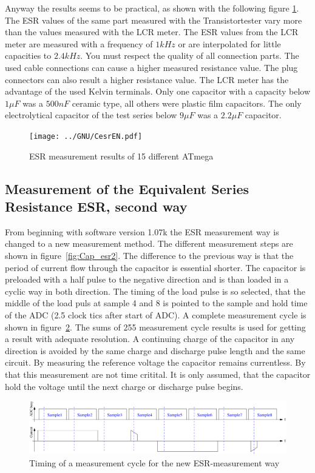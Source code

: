 Anyway the results seems to be practical, as shown with the following figure \ref{fig:Cesr}.
The ESR values of the same part measured with the Transistortester vary more than the values measured with the LCR meter.
The ESR values from the LCR meter are measured with a frequency of \(1kHz\) or are interpolated for little capacities to
\(2.4kHz\).
You must respect the quality of all connection parts. The used cable connections can cause a higher measured resistance value.
The plug connectors can also result a higher resistance value.
The LCR meter has the advantage of the used Kelvin terminals.
Only one capacitor with a capacity below \(1\mu F\) was a \(500nF\) ceramic type, all others were
plastic film capacitors.
The only electrolytical capacitor of the test series below \(9\mu F\) was a \(2.2\mu F\) capacitor.

\begin{figure}[H]
\centering
\texttt{[image: ../GNU/CesrEN.pdf]}
\caption{ESR measurement results of 15 different ATmega}
\label{fig:Cesr}
\end{figure}


\subsection{Measurement of the Equivalent Series Resistance ESR, second way}
\label{sec:ESR2}
From beginning with software version 1.07k the ESR measurement way is changed to a new measurement method.
The different measurement steps are shown in figure~\ref{fig:Cap_esr2}. The difference to the previous way is that
the period of current flow through the capacitor is essential shorter.
The capacitor is preloaded with a half pulse to the negative direction and is than loaded in a cyclic way in both
direction.
The timing of the load pulse is so selected, that the middle of the load puls at sample 4 and 8 is
pointed to the sample and hold time of the ADC (2.5 clock tics after start of ADC). 
A complete measurement cycle is shown in figure~\ref{fig:Cap_esr2_timing}.
The sums of 255 measurement cycle results is used for getting a result with adequate resolution. 
A continuing charge of the capacitor in any direction is avoided by the same charge and discharge pulse length
and the same circuit.
By measuring the reference voltage the capacitor remains currentless. By that this measurement are not time critital.
It is only assumed, that the capacitor hold the voltage until the next charge or discharge pulse begins.

\begin{figure}[H]
  \centering
    \includegraphics[width=1.\textwidth]{../FIG/Cap_esr2_timing.pdf}
  \caption{Timing of a measurement cycle for the new ESR-measurement way}
  \label{fig:Cap_esr2_timing}
\end{figure}

